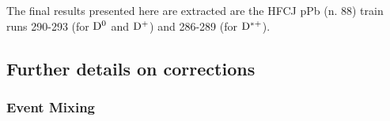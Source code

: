 The final results presented here are extracted are the HFCJ pPb (n. 88) train runs 290-293 (for ${\rm D^0}$ and ${\rm D^+}$) and 286-289 (for ${\rm D^{*+}}$).

\subsection{Further details on corrections}
\subsubsection{Event Mixing}

